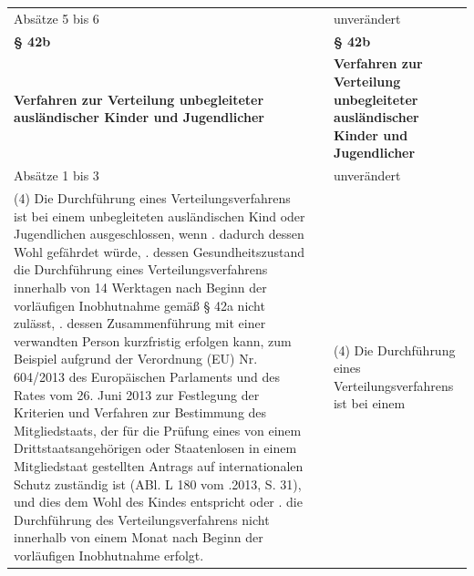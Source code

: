 \documentclass[10pt,a4paper,landscape]{article}
\begin{document}
\begin{longtable}{|L{8.2cm}|L{8.2cm}|L{8.2cm}|}
\hhline{|---|}
Absätze 5 bis 6 &  & unverändert \\
\hhline{|---|}
\textbf{\S{} 42b} &  & \textbf{\S{} 42b} \\
\hhline{|---|}
\textbf{Verfahren zur Verteilung unbegleiteter  \newline ausländischer Kinder und Jugendlicher} &  & \textbf{Verfahren zur Verteilung unbegleiteter  \newline ausländischer Kinder und Jugendlicher} \\
\hhline{|---|}
Absätze 1 bis 3 &  & unverändert \\
\hhline{|---|}
(4) Die Durchführung eines  \newline Verteilungsverfahrens ist bei einem  \newline unbegleiteten ausländischen Kind oder  \newline Jugendlichen ausgeschlossen, wenn   . dadurch dessen Wohl gefährdet würde,   . dessen Gesundheitszustand die  \newline Durchführung eines Verteilungsverfahrens  \newline innerhalb von 14 Werktagen nach Beginn  \newline der vorläufigen Inobhutnahme gemäß \S{}  \newline 42a nicht zulässt,  .   dessen Zusammenführung mit einer  \newline verwandten Person kurzfristig erfolgen  \newline kann, zum Beispiel aufgrund der  \newline Verordnung (EU) Nr. 604/2013 des  \newline Europäischen Parlaments und des Rates  \newline vom 26. Juni 2013 zur Festlegung der  \newline Kriterien und Verfahren zur Bestimmung  \newline des Mitgliedstaats, der für die Prüfung  \newline eines von einem Drittstaatsangehörigen  \newline oder Staatenlosen in einem Mitgliedstaat  \newline gestellten Antrags auf internationalen  \newline Schutz zuständig ist (ABl. L 180 vom  .2013, S. 31), und dies dem Wohl des  \newline Kindes entspricht oder   .   die Durchführung des  \newline Verteilungsverfahrens nicht innerhalb von  \newline \textcolor{diffred}{einem Monat} nach Beginn der vorläufigen  \newline Inobhutnahme erfolgt. &  & (4) Die Durchführung eines  \newline Verteilungsverfahrens ist bei einem  \newline 
\end{longtable}
\end{document}
